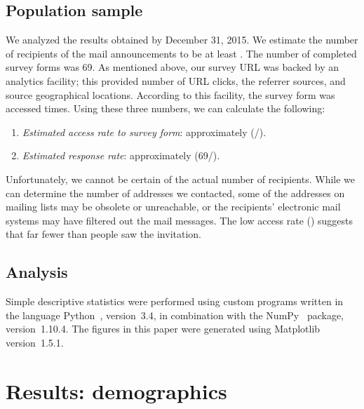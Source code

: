 \documentclass{casicswhitepaper}
\newcommand{\totalRespondents}{69\xspace}
\begin{document}
\subsection{Population sample}
\label{population-sample}

We analyzed the results obtained by December 31, 2015.  We estimate the number of recipients of the mail announcements to be at least \totalPotentialRecipients.  The number of completed survey forms was \totalRespondents.  As mentioned above, our survey URL was backed by an analytics facility; this provided number of URL clicks, the referrer sources, and source geographical locations.  According to this facility, the survey form was accessed \totalClicks times.  Using these three numbers, we can calculate the following:

\begin{enumerate}[itemsep=-0.5ex]

\item \emph{Estimated access rate to survey form}: approximately \accessRate  (\totalClicks/\totalPotentialRecipients).

\item \emph{Estimated response rate}: approximately \populationResponseRate (\totalRespondents/\totalPotentialRecipients).

\end{enumerate}

Unfortunately, we cannot be certain of the actual number of recipients.  While we can determine the number of addresses we contacted, some of the addresses on mailing lists may be obsolete or unreachable, or the recipients' electronic mail systems may have filtered out the mail messages.  The low access rate (\accessRate) suggests that far fewer than \totalPotentialRecipients people saw the invitation.


\subsection{Analysis}

Simple descriptive statistics were performed using custom programs written in the language Python~\cite{vanRossum1991interactively, perez2011python}, version~3.4, in combination with the NumPy~\cite{vanderwalt2011numpy} package, version~1.10.4.  The figures in this paper were generated using Matplotlib~\cite{hunter2007matplotlib} version~1.5.1.


\clearpage

\section{Results: demographics}
\label{demographics}
\end{document}
